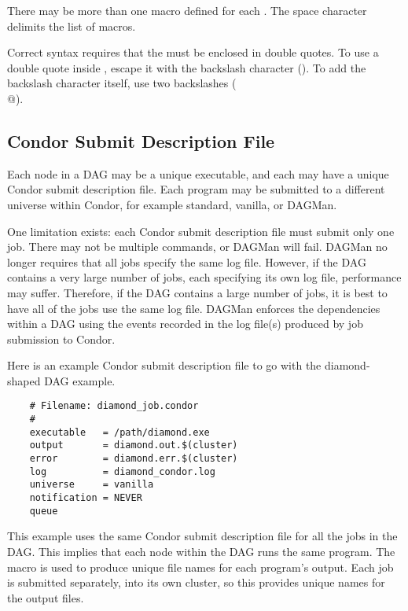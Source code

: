 There may be more than one macro defined for each .
The space character delimits the list of macros.

Correct syntax requires that the \verb@string@ must be
enclosed in double quotes.
To use a double quote inside \verb@string@,
escape it with the backslash character (\verb@\@).
To add the backslash character itself, use two backslashes (\verb@\\@).



\subsection{Condor Submit Description File}

Each node in a DAG may be a unique executable, and each may have a unique
Condor submit description file.
Each program may be submitted to a different universe
within Condor, for example standard,
vanilla, or DAGMan.

One limitation exists:
each Condor submit description file must submit only one job.
There may not be multiple \verb@queue@ commands, or DAGMan will fail.
DAGMan no longer requires that all jobs specify the same log file.
However, if the DAG contains a very large number of jobs, each
specifying its own log file, performance may suffer.  Therefore,
if the DAG contains a large number of jobs, it is best to have
all of the jobs use the same log file.
DAGMan enforces the dependencies within a DAG
using the events recorded in the
log file(s) produced by job submission to Condor.

Here is an example Condor submit description file to go with the
diamond-shaped DAG example.

\begin{verbatim}
	# Filename: diamond_job.condor
	#
	executable   = /path/diamond.exe
	output       = diamond.out.$(cluster)
	error        = diamond.err.$(cluster)
	log          = diamond_condor.log
	universe     = vanilla
	notification = NEVER
	queue
\end{verbatim}

This example uses the same Condor submit description file
for all the jobs in the DAG.
This implies that each node within the DAG runs the
same program.
The  macro
is used to produce unique file names for each program's output.
Each job is submitted separately, into its own cluster,
so this provides unique names for the output files.

